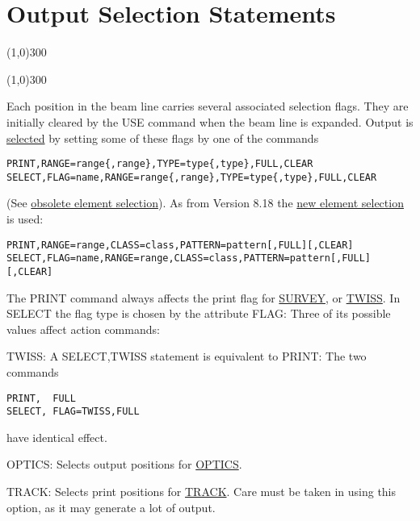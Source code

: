 
\section{Output Selection Statements}

\line(1,0){300}

\line(1,0){300}

Each position in the beam line carries several associated selection
flags. They are initially cleared by the USE command when the beam line
is expanded. Output is \href{ranges.html}{selected} by setting some of
these flags  by one of the commands  
\begin{verbatim}
PRINT,RANGE=range{,range},TYPE=type{,type},FULL,CLEAR
SELECT,FLAG=name,RANGE=range{,range},TYPE=type{,type},FULL,CLEAR
\end{verbatim} 
(See \href{ranges.html}{obsolete element selection}). As from Version
8.18 the \href{new_select.html}{new element selection} is used:  
\begin{verbatim}
PRINT,RANGE=range,CLASS=class,PATTERN=pattern[,FULL][,CLEAR]
SELECT,FLAG=name,RANGE=range,CLASS=class,PATTERN=pattern[,FULL][,CLEAR]
\end{verbatim} 
The PRINT command always affects the print flag for
\href{survey.html}{SURVEY}, or \href{survey.html}{TWISS}. In SELECT the
flag type is chosen by the attribute FLAG: Three of its possible values
affect action commands:  

TWISS: A SELECT,TWISS statement is equivalent to PRINT: The two commands 
\begin{verbatim}
PRINT,  FULL
SELECT, FLAG=TWISS,FULL
\end{verbatim} 
have identical effect. 

OPTICS: Selects output positions for \href{optics.html}{OPTICS}. 

TRACK: Selects print positions for \href{track.html}{TRACK}. Care must
be taken in using this option, as it may generate a lot of output.  

